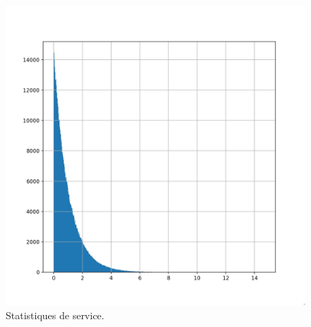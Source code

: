             \begin{figure}
                \centering
                \includegraphics[width=\textwidth]{images/statistiques_de_service.jpg}
                \caption{Statistiques de service.}
                \label{fig:statistiques_de_service}
            \end{figure}
            
